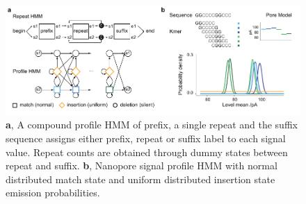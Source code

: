 \begin{figure}[h]
	\centering
	\includegraphics[width=1.0\textwidth]{figures/strique/count_hmm.pdf}
	\captionsetup{format=plain}
	\caption[Nanopore signal processing with STRique]{\textbf{a}, A compound profile HMM of prefix, a single repeat and the suffix sequence assigns either prefix, repeat or suffix label to each signal value. Repeat counts are obtained through dummy states between repeat and suffix. \textbf{b}, Nanopore signal profile HMM with normal distributed match state and uniform distributed insertion state emission probabilities.}
	\label{fig:strique:count_hmm}
\end{figure}